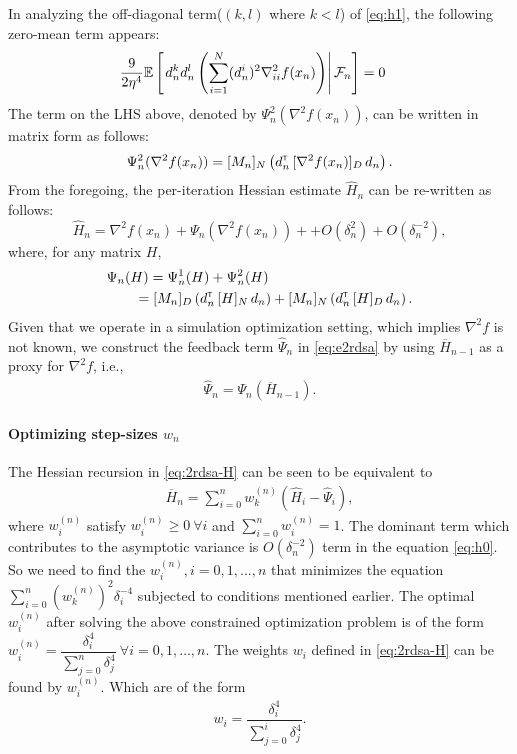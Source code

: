 \documentclass[letterpaper, 10 pt, conference]{ieeeconf}  %
\begin{document}
In analyzing the off-diagonal term($(k,l)$ where $k < l$) of \eqref{eq:h1}, the following zero-mean term appears:
\begin{align}
& \dfrac{9}{2\eta^4} \mathbb{E}\left[\left.d_n^k d_n^l   \left(\sum\limits_{i=1}^N (d_n^i)^2 \nabla^2_{ii} f(x_n)\right)\right| \mathcal{F}_n \right] = 0
\end{align}
The term on the LHS above, denoted by $\Psi_{n}^{2}(\nabla^2 f(x_n))$, can be written in matrix form as follows: 
\begin{align}\label{eq:ndmat}
\Psi_{n}^{2}(\nabla^2 f(x_n)) = [M_n]_{N}\left(d_{n}^\mathsf{\scriptscriptstyle T} \, [\nabla^2 f(x_n)]_{D} \, d_{n}\right).
\end{align}
From the foregoing, the per-iteration Hessian estimate $\widehat H_n$ can be re-written as follows:
$$ \widehat H_n = \nabla^2 f(x_n) + \Psi_{n}(\nabla^2 f(x_n)) + +  O(\delta_n^2) + O(\delta_n^{-2}),$$
where, for any matrix $H$, 
\begin{align}
&\Psi_{n}(H) = \Psi_{n}^{1}(H) + \Psi_{n}^{2}(H)\nonumber\\
&\qquad= [M_n]_{D}\left(d_{n}^\mathsf{\scriptscriptstyle T} \, [H]_{N} \, d_{n}\right) +  [M_n]_{N}\left(d_{n}^\mathsf{\scriptscriptstyle T} \, [H]_{D} \, d_{n}\right).
\end{align}
Given that we operate in a simulation optimization setting, which implies $\nabla^2 f$ is not known, we construct the feedback term $\widehat \Psi_n$ in \eqref{eq:e2rdsa} by using $\overline H_{n-1}$ as a proxy for $\nabla^2 f$, i.e.,
\begin{align}
\widehat \Psi_n = \Psi_{n} (\overline H_{n-1}).
\end{align}

\paragraph{Optimizing step-sizes $w_n$}
The Hessian recursion in \eqref{eq:2rdsa-H} can be seen to be equivalent to
\begin{align}
\label{eq:hess}
\overline H_n = \sum\limits_{i=0}^{n} w_k^{(n)}(\widehat H_i -\widehat \Psi_i),
\end{align}
where $w_i^{(n)}$ satisfy $w_i^{(n)} \geq 0 ~\forall i$ and $\sum \limits_{i=0}^{n}w_i^{(n)} = 1$. The dominant term which contributes to the asymptotic variance is $O(\delta_n^{-2})$ term in the equation \eqref{eq:h0}. So we need to find the $w_i^{(n)},i=0,1,\ldots,n$ that minimizes the equation $\sum \limits_{i=0}^{n} (w_k^{(n)})^2 \delta_i^{-4}$ subjected to conditions mentioned earlier. The optimal $w_i^{(n)}$ after solving the above constrained optimization problem is of the form $w_i^{(n)} = \dfrac{\delta_i^{4}}{\sum \limits_{j=0}^{n} \delta_j^{4}} ~\forall i=0,1,\ldots,n$. The weights $w_i$ defined in \eqref{eq:2rdsa-H}
can be found by $w_i^{(n)}$. Which are of the form 
\begin{align}
\label{eq:wieghts}
w_i  = \dfrac{\delta_i^{4}}{\sum\limits_{j=0}^{i} \delta_j^{4} } .
\end{align}
\end{document}
